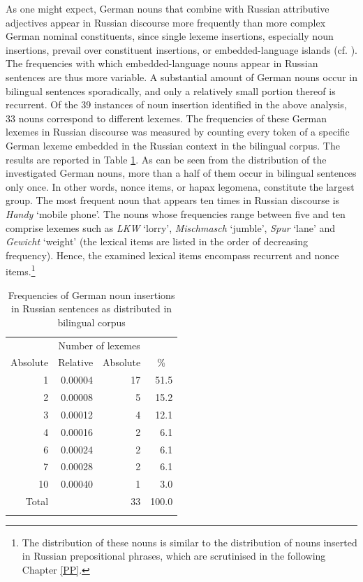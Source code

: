 As one might expect, German nouns that combine with Russian attributive adjectives appear in Russian discourse more frequently than more complex German nominal constituents, since single lexeme insertions, especially noun insertions, prevail over constituent insertions, or embedded-language islands (cf. ). The frequencies with which embedded-language nouns appear in Russian sentences are thus more variable. A substantial amount of German nouns occur in bilingual sentences sporadically, and only a relatively small portion thereof is recurrent. Of the 39 instances of noun insertion identified in the above analysis, 33 nouns correspond to different lexemes. The frequencies of these German lexemes in Russian discourse was measured by counting every token of a specific German lexeme embedded in the Russian context in the bilingual corpus. The results are reported in Table \ref{tab:4:3}. As can be seen from the distribution of the investigated German nouns, more than a half of them occur in bilingual sentences only once. In other words, nonce items, or hapax legomena, constitute the largest group. The most frequent noun that appears ten times in Russian discourse is \textit{Handy} `mobile phone'. The nouns whose frequencies range between five and ten comprise lexemes such as \textit{LKW} `lorry', \textit{Mischmasch} `jumble', \textit{Spur} `lane' and \textit{Gewicht} `weight' (the lexical items are listed in the order of decreasing frequency). Hence, the examined lexical items encompass recurrent and nonce items.\footnote{The distribution of these nouns is similar to the distribution of nouns inserted in Russian prepositional phrases, which are scrutinised in the following Chapter \ref{PP}.}

\begin{table}
\begin{tabular}{rrrr}
\lsptoprule
        \multicolumn{2}{c}{Word frequency} & \multicolumn{2}{c}{Number of lexemes}\\\cmidrule(lr){1-2}\cmidrule(lr){3-4}
		\multicolumn{1}{c}{Absolute} & \multicolumn{1}{c}{Relative} & \multicolumn{1}{c}{Absolute} & \multicolumn{1}{c}{\%} \\\midrule
		1	& 0.00004	& 17	& 51.5\\
		2	& 0.00008	& 5	& 15.2\\
		3	& 0.00012	& 4	& 12.1\\
		4	& 0.00016	& 2	& 6.1\\
		6	& 0.00024	& 2	& 6.1\\
		7	& 0.00028	& 2	& 6.1\\
		10	& 0.00040	& 1	& 3.0\\
         Total	& 	& 33	& 100.0\\  
	\lspbottomrule
\end{tabular}
	\caption{Frequencies of German noun insertions in Russian sentences as distributed in bilingual corpus}\label{tab:4:3}
\end{table}

